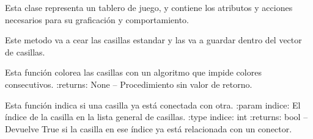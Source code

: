\documentclass[letterpaper,10pt,english]{sphinxmanual}
\begin{document}

\begin{fulllineitems}
\label{\detokenize{codigo:tablero.TableroSE}}
Esta clase representa un tablero de juego, y contiene los
atributos y acciones necesarios para su graficación y comportamiento.

\begin{fulllineitems}
\label{\detokenize{codigo:tablero.TableroSE.cargarCasillas}}
Este metodo va a cear las casillas estandar y las va a guardar dentro del vector de casillas.

\end{fulllineitems}


\begin{fulllineitems}
\label{\detokenize{codigo:tablero.TableroSE.colorearCasillas}}
Esta función colorea las casillas con un algoritmo que impide colores consecutivos. 
:returns:  None -- Procedimiento sin valor de retorno.

\end{fulllineitems}


\begin{fulllineitems}
\label{\detokenize{codigo:tablero.TableroSE.existeConexion}}
Esta función indica si una casilla ya está conectada con otra.
:param indice: El índice de la casilla en la lista general de casillas.
:type indice: int
:returns:  bool -- Devuelve True si la casilla en ese índice ya está relacionada con un conector.

\end{fulllineitems}


\end{fulllineitems}
\end{document}
